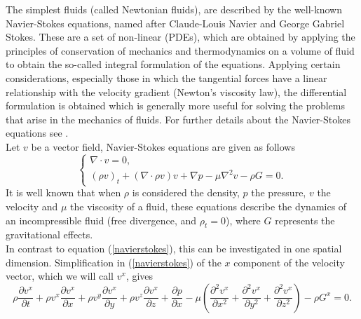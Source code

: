     The simplest fluids (called Newtonian fluids), are described by the well-known Navier-Stokes equations, named after Claude-Louis Navier and George Gabriel Stokes. These are a set of non-linear (PDEs), which are obtained by applying the principles of conservation of mechanics and thermodynamics on a volume of fluid to obtain the so-called integral formulation of the equations. Applying certain considerations, especially those in which the tangential forces have a linear relationship with the velocity gradient (Newton's viscosity law), the differential formulation is obtained which is generally more useful for solving the problems that arise in the mechanics of fluids. For further details about the Navier-Stokes equations see \cite{Acheson2001, Batchelor1967, Landau1987, Currie1974, Temam1984}. \\
    
    Let $v$ be a vector field, Navier-Stokes equations are given as follows
    \begin{equation}
        \left \lbrace \begin{array}{ll}
    	\nabla \cdot v = 0, \\
    	(\rho v)_t + (\nabla \cdot \rho v) v + \nabla p - \mu \nabla^2 v - \rho G = 0.
    	\end{array}  \right .
    	\label{navierstokes}
    \end{equation}
    It is well known that when $\rho$ is considered the density, $p$ the pressure, $v$ the velocity and $\mu$ the viscosity of a fluid, these equations describe the dynamics of an incompressible fluid (free divergence, and $\rho_t = 0$), where $G$ represents the gravitational effects. \\
    
    In contrast to equation (\ref{navierstokes}), this can be investigated in one spatial dimension. Simplification in (\ref{navierstokes}) of the $x$ component of the velocity vector, which we will call $v^x$, gives
    \begin{equation*}
        \rho \frac{\partial v^x}{\partial t} + \rho v^x \frac{\partial v^x}{\partial x} + \rho v^y \frac{\partial v^x}{\partial y} + \rho v^z \frac{\partial v^x}{\partial z} + \frac{\partial p}{\partial x} - \mu \left(\frac{\partial^2 v^x}{\partial x^2} + \frac{\partial^2 v^x}{\partial y^2} + \frac{\partial^2 v^x}{\partial z^2} \right) - \rho G^x = 0.
    \end{equation*}


